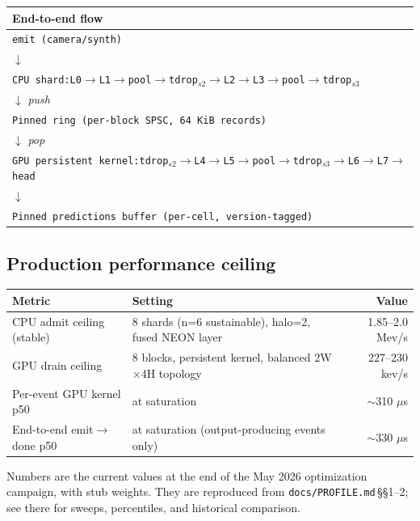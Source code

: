 \documentclass[11pt,a4paper]{article}
\begin{document}
\begin{center}
\small
\begin{tabular}{l}
\toprule
\textbf{End-to-end flow} \\
\midrule
\texttt{emit (camera/synth)} \\
\;\;\;\(\downarrow\) \\
\texttt{CPU shard:\;L0\(\to\)L1\(\to\)pool\(\to\)tdrop\(_{s2}\)\(\to\)L2\(\to\)L3\(\to\)pool\(\to\)tdrop\(_{s3}\)} \\
\;\;\;\(\downarrow\)\;\; \emph{push} \\
\texttt{Pinned ring (per-block SPSC, 64 KiB records)} \\
\;\;\;\(\downarrow\)\;\; \emph{pop} \\
\texttt{GPU persistent kernel:\;tdrop\(_{s2}\)\(\to\)L4\(\to\)L5\(\to\)pool\(\to\)tdrop\(_{s3}\)\(\to\)L6\(\to\)L7\(\to\)head} \\
\;\;\;\(\downarrow\) \\
\texttt{Pinned predictions buffer (per-cell, version-tagged)} \\
\bottomrule
\end{tabular}
\end{center}

\subsection{Production performance ceiling}

\begin{tabularx}{\linewidth}{lXr}
\toprule
\textbf{Metric} & \textbf{Setting} & \textbf{Value} \\
\midrule
CPU admit ceiling (stable)   & 8 shards (n=6 sustainable), halo=2, fused NEON layer & 1.85--2.0 Mev/s \\
GPU drain ceiling            & 8 blocks, persistent kernel, balanced 2W$\times$4H topology & 227--230 kev/s \\
Per-event GPU kernel p50     & at saturation                                              & $\sim$310 \(\mu\)s \\
End-to-end emit\(\to\)done p50 & at saturation (output-producing events only)             & $\sim$330 \(\mu\)s \\
\bottomrule
\end{tabularx}

Numbers are the current values at the end of the May 2026 optimization
campaign, with stub weights. They are reproduced from
\texttt{docs/PROFILE.md}\,\S\S 1--2; see there for sweeps, percentiles,
and historical comparison.
\end{document}
